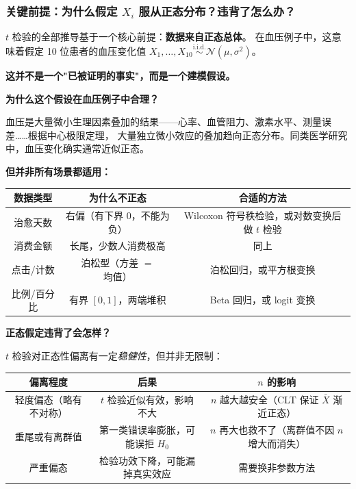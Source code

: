 \subsubsection{关键前提：为什么假定 $X_i$ 服从正态分布？违背了怎么办？}

$t$ 检验的全部推导基于一个核心前提：\textbf{数据来自正态总体}。
在血压例子中，这意味着假定 10 位患者的血压变化值 $X_1,\dots,X_{10} \stackrel{\mathrm{i.i.d.}}{\sim} \mathcal{N}(\mu, \sigma^2)$。

\textbf{这并不是一个"已被证明的事实"，而是一个建模假设。}

\medskip
\textbf{为什么这个假设在血压例子中合理？}

血压是大量微小生理因素叠加的结果——心率、血管阻力、激素水平、测量误差……根据中心极限定理，
大量独立微小效应的叠加趋向正态分布。同类医学研究中，血压变化确实通常近似正态。

\textbf{但并非所有场景都适用：}

\begin{center}
\footnotesize
\renewcommand{\arraystretch}{1.3}
\begin{tabular}{c|c|c}
\toprule
\textbf{数据类型} & \textbf{为什么不正态} & \textbf{合适的方法} \\
\midrule
治愈天数 & 右偏（有下界 0，不能为负） & Wilcoxon 符号秩检验，或对数变换后做 $t$ 检验 \\
消费金额 & 长尾，少数人消费极高 & 同上 \\
点击/计数 & 泊松型（方差 $=$ 均值） & 泊松回归，或平方根变换 \\
比例/百分比 & 有界 $[0,1]$，两端堆积 & Beta 回归，或 logit 变换 \\
\bottomrule
\end{tabular}
\end{center}

\medskip
\textbf{正态假定违背了会怎样？}

$t$ 检验对正态性偏离有一定\emph{稳健性}，但并非无限制：

\begin{center}
\renewcommand{\arraystretch}{1.3}
\begin{tabular}{c|c|c}
\toprule
\textbf{偏离程度} & \textbf{后果} & \textbf{$n$ 的影响} \\
\midrule
轻度偏态（略有不对称） & $t$ 检验近似有效，影响不大 & $n$ 越大越安全（CLT 保证 $\bar{X}$ 渐近正态） \\
重尾或有离群值       & 第一类错误率膨胀，可能误拒 $H_0$ & $n$ 再大也救不了（离群值不因 $n$ 增大而消失） \\
严重偏态             & 检验功效下降，可能漏掉真实效应 & 需要换非参数方法 \\
\bottomrule
\end{tabular}
\end{center}

